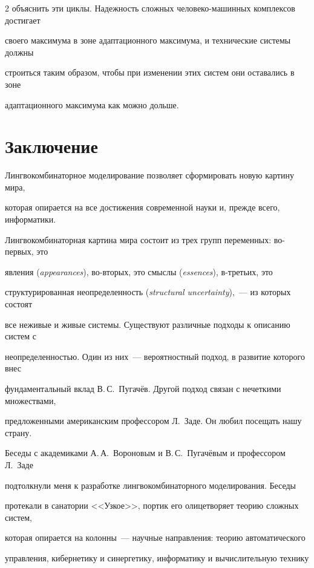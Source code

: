 \begin{multicols}{2}
объяснить эти цик\-лы. Надежность сложных человеко-машинных комплексов достигает 


своего максимума в зоне адап\-та\-ци\-он\-но\-го максимума, и технические сис\-те\-мы должны 


строиться таким образом, чтобы при изменении этих систем они оставались в зоне 


адаптационного максимума как можно дольше. 





\section{Заключение}





      Лингвокомбинаторное моделирование позволяет сформировать новую картину мира, 


которая опирается на все достижения современной науки и, прежде всего, информатики. 


Лингвокомбинаторная картина мира состоит из трех групп переменных: во-первых, это 


явления (\textit{appearances}), во-вто\-рых, это смыслы (\textit{essences}), в-третьих, это 


структурированная неопределенность (\textit{structural uncertainty}),~--- из которых состоят 


все неживые и живые сис\-те\-мы. Существуют различные подходы к описанию систем с 


неопределенностью. Один из них~--- вероятностный подход, в развитие которого внес 


фундаментальный вклад В.\,С.~Пугачёв. Другой подход связан с нечеткими множествами, 


предложенными американским профессором Л.~Заде. Он любил посещать нашу страну. 


Беседы с академиками А.\,А.~Вороновым и В.\,С.~Пугачёвым и профессором Л.~Заде 


подтолкнули меня к разработке линг\-во\-ком\-би\-на\-тор\-но\-го моделирования. Беседы 


протекали в санатории <<Узкое>>, портик его олицетворяет теорию сложных систем, 


которая опирается на колонны~--- научные направления: теорию автоматического 


      управ\-ле\-ния, кибернетику и синергетику, информатику и вычислительную технику 



\end{multicols}
